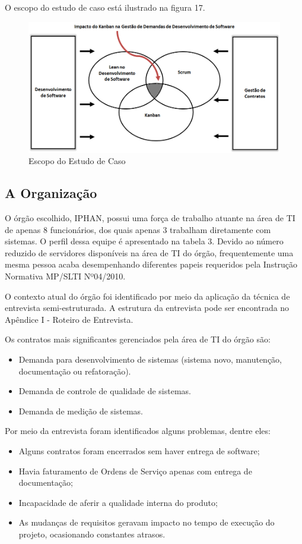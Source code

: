 O escopo do estudo de caso está ilustrado na figura 17. 
\begin{figure}[H]
		\centering
		\label{fig01}
			\includegraphics[scale=0.6]{figuras/escopoEC.png}
		\caption{Escopo do Estudo de Caso}
\end{figure}

\subsection[A Organização]{A Organização}

O órgão escolhido, IPHAN, possui uma força de trabalho atuante na área de TI de apenas 8 funcionários, dos quais apenas 3 trabalham diretamente com sistemas. O perfil dessa equipe é apresentado na tabela 3. Devido ao número reduzido de servidores disponíveis na área de TI do órgão, frequentemente uma mesma pessoa acaba desempenhando diferentes papeis requeridos pela Instrução Normativa MP/SLTI Nº04/2010.

O contexto atual do órgão foi identificado por meio da aplicação da técnica de entrevista semi-estruturada. A estrutura da entrevista pode ser encontrada no Apêndice I -  Roteiro de Entrevista.

Os contratos mais significantes gerenciados pela área de TI do órgão são:
\begin{itemize}
\item Demanda para desenvolvimento de sistemas (sistema novo, manutenção, documentação ou refatoração).
\item Demanda de controle de qualidade de sistemas.
\item Demanda de medição de sistemas.
\end{itemize}

Por meio da entrevista foram identificados alguns problemas, dentre eles:
\begin{itemize}
\item Alguns contratos foram encerrados sem haver entrega de software;
\item Havia faturamento de Ordens de Serviço apenas com entrega de documentação;
\item Incapacidade de aferir a qualidade interna do produto;
\item As mudanças de requisitos geravam impacto no tempo de execução do projeto, ocasionando constantes atrasos.
\end{itemize}

